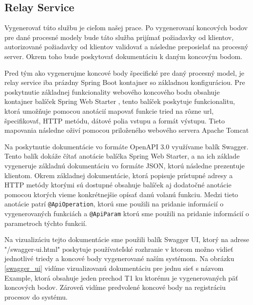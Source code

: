 \subsection{Relay Service}

Vygenerovať túto službu je cieľom našej prace. Po vygenerovaní koncových bodov pre dané procesné modely bude táto služba prijímať požiadavky od klientov, autorizované požiadavky od klientov validovať a následne preposielať na procesný server. Okrem toho bude poskytovať dokumentáciu k daným koncovým bodom.

Pred tým ako vygenerujme koncové body špecifické pre daný procesný model, je relay service iba prázdny Spring Boot kontajner so základnou konfiguráciou. Pre poskytnutie základnej funkcionality webového koncového bodu obsahuje kontajner balíček Spring Web Starter \cite{webstarter}, tento balíček poskytuje funkcionalitu, ktorá umožňuje pomocou anotácií mapovať funkcie tried na rôzne \acrshort{url}, špecifikovať, HTTP metódu, dátové polia vstupu a formát výstupu. Tieto mapovania následne oživí pomocou priloženého webového servera Apache Tomcat \cite{tomcat}


Na poskytnutie dokumentácie vo formáte OpenAPI 3.0 \cite{openapi} využívame balík Swagger. Tento balík dokáže čítať anotácie balíčka Spring Web Starter, a na ich základe vygeneruje základnú dokumentáciu vo formáte JSON, ktorú následne prezentuje klientom. Okrem základnej dokumentácie, ktorá popisuje prístupné adresy a HTTP metódy ktorými sú dostupné obsahuje balíček aj dodatočné anotácie pomocou ktorých vieme konkrétnejšie opísať danú volanú funkciu. Medzi tieto anotácie patrí \texttt{@ApiOperation}, ktorú sme použili na pridanie informácií o vygenerovaných funkciách a \texttt{@ApiParam} ktorú sme použili na pridanie informácií o parametroch týchto funkcií.

Na vizualizáciu tejto dokumentácie sme použili balík Swagger UI, ktorý na adrese "/swagger-ui.html" poskytuje používateľské rozhranie v ktorom možno vidieť jednotlivé triedy a koncové body vygenerované naším systémom. Na obrázku \ref{swagger_ui} vidíme vizualizovanú dokumentáciu pre jednu sieť s názvom Example, ktorá obsahuje jeden prechod T1 ku ktorému je vygenerovaných päť koncových bodov. Zároveň vidíme predvolené koncové body na registráciu procesov do systému.

